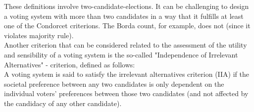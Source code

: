 These definitions involve two-candidate-elections. It can be challenging to design a voting system with more than two candidates in a way that it fulfills at least one of the Condorcet criterions. The Borda count, for example, does not (since it violates majority rule). \\
Another criterion that can be considered related to the assessment of the utility and sensibility of a voting system is the so-called "Independence of Irrelevant Alternatives" - criterion, defined as follows: \\
A voting system is said to satisfy the irrelevant alternatives criterion (IIA) if the societal preference between any two candidates is only dependent on the individual voters' preferences between those two candidates (and not affected by the candidacy of any other candidate). \\
